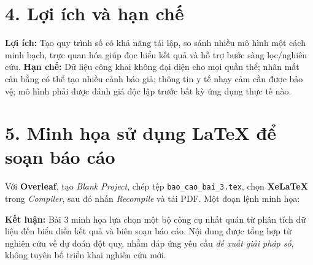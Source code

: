 \documentclass[12pt,a4paper]{article}
\begin{document}
\section*{4. Lợi ích và hạn chế}
\textbf{Lợi ích:} Tạo quy trình số có khả năng tái lập, so sánh nhiều mô hình một cách minh bạch, trực quan hóa giúp đọc hiểu kết quả và hỗ trợ bước sàng lọc/nghiên cứu. \textbf{Hạn chế:} Dữ liệu công khai không đại diện cho mọi quần thể; nhãn mất cân bằng có thể tạo nhiều cảnh báo giả; thông tin y tế nhạy cảm cần được bảo vệ; mô hình phải được đánh giá độc lập trước bất kỳ ứng dụng thực tế nào.

\section*{5. Minh họa sử dụng LaTeX để soạn báo cáo}
Với \textbf{Overleaf}, tạo \textit{Blank Project}, chép tệp \texttt{bao\_cao\_bai\_3.tex}, chọn \textbf{XeLaTeX} trong \textit{Compiler}, sau đó nhấn \textit{Recompile} và tải PDF. Một đoạn lệnh minh họa:
\begin{center}
\end{center}
\textbf{Kết luận:} Bài 3 minh họa lựa chọn một bộ công cụ nhất quán từ phân tích dữ liệu đến biểu diễn kết quả và biên soạn báo cáo. Nội dung được tổng hợp từ nghiên cứu về dự đoán đột quỵ, nhằm đáp ứng yêu cầu \textit{đề xuất giải pháp số}, không tuyên bố triển khai nghiên cứu mới.
\end{document}
